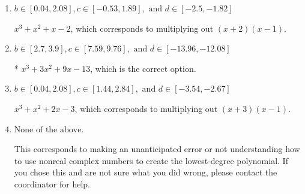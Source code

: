 \documentclass{extbook}[14pt]
\begin{document}
\begin{enumerate}
{\begin{enumerate}[label=\Alph*.]
$x^{3} -3 x^{2} +9 x + 13$, which corresponds to multiplying out $(x-(-2 - 3 i))(x-(-2 + 3 i))(x + 1)$.
\item \( b \in [0.04, 2.08], c \in [-0.53, 1.89], \text{ and } d \in [-2.5, -1.82] \)

$x^{3} + x^{2} +x -2$, which corresponds to multiplying out $(x + 2)(x -1)$.
\item \( b \in [2.7, 3.9], c \in [7.59, 9.76], \text{ and } d \in [-13.96, -12.08] \)

* $x^{3} +3 x^{2} +9 x -13$, which is the correct option.
\item \( b \in [0.04, 2.08], c \in [1.44, 2.84], \text{ and } d \in [-3.54, -2.67] \)

$x^{3} + x^{2} +2 x -3$, which corresponds to multiplying out $(x + 3)(x -1)$.
\item \( \text{None of the above.} \)

This corresponds to making an unanticipated error or not understanding how to use nonreal complex numbers to create the lowest-degree polynomial. If you chose this and are not sure what you did wrong, please contact the coordinator for help.
\end{enumerate}

}
\end{enumerate}
\end{document}
